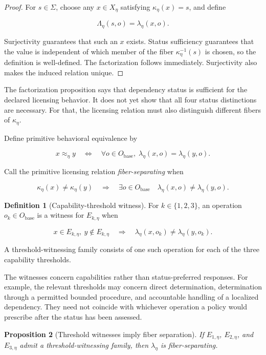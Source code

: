 \documentclass[11pt]{article}
\newtheorem{proposition}{Proposition}[section]
\theoremstyle{definition}
\newtheorem{definition}[proposition]{Definition}
\theoremstyle{remark}
\begin{document}
\begin{proof}
For \(s\in\Sigma\), choose any \(x\in X_{\eta}\) satisfying \(\kappa_{\eta}(x)=s\), and define

\[
\Lambda_{\eta}(s,o)=\lambda_{\eta}(x,o).
\]

Surjectivity guarantees that such an \(x\) exists. Status sufficiency guarantees that the value is independent of which member of the fiber \(\kappa_{\eta}^{-1}(s)\) is chosen, so the definition is well-defined. The factorization follows immediately. Surjectivity also makes the induced relation unique.
\end{proof}

The factorization proposition says that dependency status is sufficient for the declared licensing behavior. It does not yet show that all four status distinctions are necessary. For that, the licensing relation must also distinguish different fibers of \(\kappa_{\eta}\).

Define primitive behavioral equivalence by

\[
x\approx_{\eta}y
\quad\Longleftrightarrow\quad
\forall o\in O_{\mathrm{base}},
\;
\lambda_{\eta}(x,o)=\lambda_{\eta}(y,o).
\]

Call the primitive licensing relation \emph{fiber-separating} when

\[
\kappa_{\eta}(x)\neq\kappa_{\eta}(y)
\quad\Longrightarrow\quad
\exists o\in O_{\mathrm{base}}
\quad
\lambda_{\eta}(x,o)\neq\lambda_{\eta}(y,o).
\]

\begin{definition}[Capability-threshold witness]
\label{def:capability-threshold-witness}
For \(k\in\{1,2,3\}\), an operation \(o_k\in O_{\mathrm{base}}\) is a witness for \(E_{k,\eta}\) when

\[
x\in E_{k,\eta},\ y\notin E_{k,\eta}\quad\Longrightarrow\quad\lambda_{\eta}(x,o_k)\neq\lambda_{\eta}(y,o_k).
\]

A threshold-witnessing family consists of one such operation for each of the three capability thresholds.
\end{definition}

The witnesses concern capabilities rather than status-preferred responses. For example, the relevant thresholds may concern direct determination, determination through a permitted bounded procedure, and accountable handling of a localized dependency. They need not coincide with whichever operation a policy would prescribe after the status has been assessed.

\begin{proposition}[Threshold witnesses imply fiber separation]
\label{prop:threshold-witness-separation}
If \(E_{1,\eta}\), \(E_{2,\eta}\), and \(E_{3,\eta}\) admit a threshold-witnessing family, then \(\lambda_{\eta}\) is fiber-separating.
\end{proposition}
\end{document}
